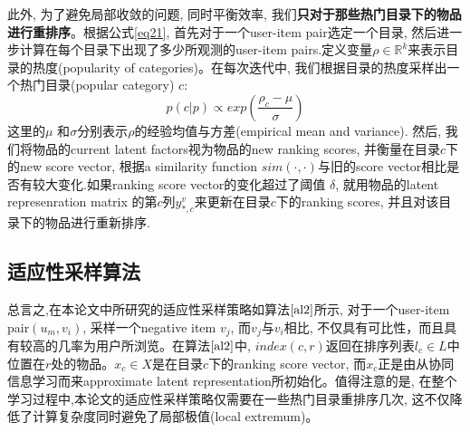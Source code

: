 此外, 为了避免局部收敛的问题, 同时平衡效率, 我们\textbf{只对于那些热门目录下的物品进行重排序}。根据公式\eqref{eq21}, 首先对于一个user-item pair选定一个目录, 然后进一步计算在每个目录下出现了多少所观测的user-item pairs.定义变量$\rho \in \mathbb{R}^k$来表示目录的热度(popularity of categories)。在每次迭代中, 我们根据目录的热度采样出一个热门目录(popular category) $c$:
\begin{equation}
p\left(c|p\right) \propto exp\left(\frac{\rho_c - \mu }{\sigma}\right)
\end{equation}
这里的$\mu$ 和$\sigma$分别表示$\rho$的经验均值与方差(empirical mean and variance). 然后, 我们将物品的current latent factors视为物品的new ranking scores, 并衡量在目录$c$下的new score vector, 根据a similarity function $sim\left(\cdot,\cdot\right)$与旧的score vector相比是否有较大变化.如果ranking score vector的变化超过了阈值 $\delta$, 就用物品的latent represenration matrix 的第$c$列$y_{*,c}^v$来更新在目录$c$下的ranking scores, 并且对该目录下的物品进行重新排序.

\subsection{适应性采样算法}


总言之,在本论文中所研究的适应性采样策略如算法$\ref{al2}$所示, 对于一个user-item pair$\left(u_m,v_i\right)$, 采样一个negative item $v_j$, 而$v_j$与$v_i$相比, 不仅具有可比性，而且具有较高的几率为用户所浏览。在算法$\ref{al2}$中, $index\left(c,r\right)$返回在排序列表$l_c \in L$中位置在$r$处的物品。$x_c \in X$是在目录$c$下的ranking score vector, 而$x_c$正是由从协同信息学习而来approximate latent representation所初始化。值得注意的是, 在整个学习过程中,本论文的适应性采样策略仅需要在一些热门目录重排序几次, 这不仅降低了计算复杂度同时避免了局部极值(local extremum)。

